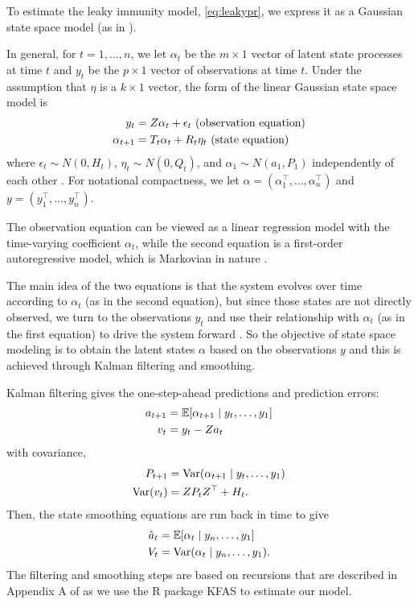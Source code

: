 \documentclass{article}
\begin{document}
To estimate the leaky immunity model, \autoref{eq:leakypr}, we express it as a 
Gaussian state space model (as in \citealp{durbin2012time, helske2017kfas}).

In general, for $t = 1, \dots, n$, we let $\alpha_t$ be the $m \times 1$ vector of latent
state processes at time $t$ and $y_t$ be the $p \times 1$ vector of observations
at time $t$. Under the assumption that $\eta$ is a $k \times 1$ vector, the
form of the linear Gaussian state space model is 
\begin{align}
y_t &= Z\alpha_t + \epsilon_t  \text{     (observation equation)} \label{eq:ss1}\\
\alpha_{t+1} &= T_t\alpha_t + R_t\eta_t  \text{     (state equation) \label{eq:ss2}}
\end{align}
where $\epsilon_t \sim N(0, H_t)$, $\eta_t \sim N(0, Q_t)$, and $\alpha_1 \sim
N(a_1, P_1)$ independently of each other \citep{helske2017kfas}. For notational
compactness, we let $\alpha = \left ( \alpha_1^\top, \dots, \alpha_n^\top \right )$
and $y = \left ( y_1^\top, \dots, y_n^\top \right )$.

The observation equation can be viewed as a linear regression model with the
time-varying coefficient $\alpha_t$, while the second equation is a first-order
autoregressive model, which is Markovian in nature \citep{durbin2012time}. 

The main idea of the two equations is that the system evolves over time
according to $\alpha_t$ (as in the second equation), but since those states are
not directly observed, we turn to the observations $y_t$ and use their
relationship with $\alpha_t$ (as in the first equation) to drive the system
forward \citep{durbin2012time}. So the objective of state space modeling is to
obtain the latent states $\alpha$ based on the observations $y$ and this is
achieved through Kalman filtering and smoothing. 

Kalman filtering gives the one-step-ahead predictions and prediction errors:
\begin{align*}
a_{t+1} &= \mathbb{E}[\alpha_{t+1}\mid y_t, \dots, y_1] \\
v_t &= y_t - Za_t
\end{align*} with covariance, 
\begin{align*}
P_{t+1} &= \operatorname{Var}(\alpha_{t+1} \mid y_t, \dots, y_1) \\
\operatorname{Var}(v_t) &= ZP_tZ^\top + H_t.
\end{align*}
Then, the state smoothing equations are run back in time to give
\begin{align}
\hat{a}_t &= \mathbb{E}[\alpha_{t}\mid y_n, \dots, y_1] \label{eq:hatat}\\
V_t &= \operatorname{Var}(\alpha_{t}\mid y_n, \dots, y_1). \label{eq:Vt}
\end{align}
The filtering and smoothing steps are based on recursions that are described in
Appendix A of \citet{helske2017kfas} as we use the R package KFAS to estimate
our model.
\end{document}
